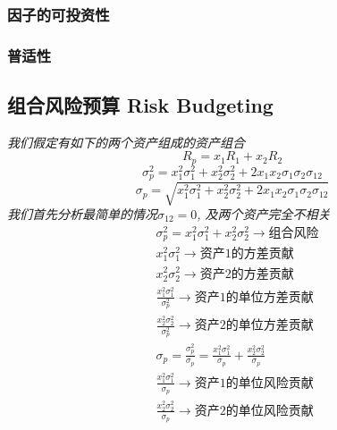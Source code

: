 \documentclass{scrartcl}
\numberwithin{equation}{section}   %
\begin{document}
\subsubsection{因子的可投资性}
\subsubsection{普适性}
\subsection{组合风险预算 Risk Budgeting}
\textsl{我们假定有如下的两个资产组成的资产组合}
$$ R_p = x_1 R_1 + x_2 R_2 $$
$$\sigma_p^2 = x_1^2 \sigma_1^2 + x_2^2 \sigma_2^2 + 2x_1 x_2 \sigma_1 \sigma_2 \sigma_{12}$$
$$\sigma_p = \sqrt{x_1^2 \sigma_1^2 + x_2^2 \sigma_2^2 + 2x_1 x_2 \sigma_1 \sigma_2 \sigma_{12}}$$
\textsl{我们首先分析最简单的情况$ \sigma_{12} = 0 $, 及两个资产完全不相关}
\begin{equation}
    \begin{aligned}
         & \sigma_p^2 = x_1^2 \sigma_1^2 + x_2^2 \sigma_2^2  \rightarrow  组合风险                                                 \\
         & x_1^2 \sigma_1^2 \rightarrow  资产1 的方差贡献                                                                          \\
         & x_2^2 \sigma_2^2 \rightarrow  资产2 的方差贡献                                                                          \\
         & \frac {x_1^2 \sigma_1^2 }{ \sigma_p^2} \rightarrow 资产1的单位方差贡献                                                  \\
         & \frac {x_2^2 \sigma_2^2 }{ \sigma_p^2} \rightarrow  资产2的单位方差贡献                                                 \\
         & \sigma_p = \frac {\sigma_p^2} {\sigma_p} =  \frac {x_1^2 \sigma_1^2 }{ \sigma_p} + \frac {x_2^2 \sigma_2^2 }{ \sigma_p} \\
         & \frac {x_1^2 \sigma_1^2 }{ \sigma_p}  \rightarrow  资产1的单位风险贡献                                                  \\
         & \frac {x_2^2 \sigma_2^2 }{ \sigma_p}  \rightarrow  资产2的单位风险贡献
    \end{aligned}
\end{equation}
\end{document}
